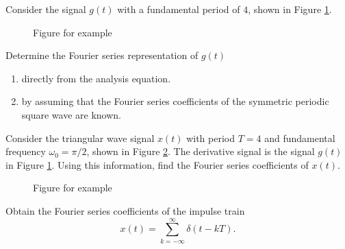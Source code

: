 \begin{frame}
    \begin{example}%
        Consider the signal $g(t)$ with a fundamental period of $4$, shown in Figure \ref{fi:example3p6}.
        \begin{figure}
          \centering
          
          \caption{Figure for example}\label{fi:example3p6}
        \end{figure}

        Determine the Fourier series representation of $g(t)$
        \begin{enumerate}
            \item directly from the analysis equation.
            \item by assuming that the Fourier series coefficients of the symmetric periodic square wave are known.
        \end{enumerate}
    \end{example}
\end{frame}

\begin{frame}
{
}
\end{frame}



\begin{frame}%
    \begin{example}
        Consider the triangular wave signal $x(t)$ with period $T=4$ and fundamental frequency $\omega_0 = \pi/2$, shown in Figure \ref{fi:example3p7}. The derivative signal is the signal $g(t)$ in Figure \ref{fi:example3p6}. Using this information, find the Fourier series coefficients of $x(t)$.
        \begin{figure}
          \centering
          
          \caption{Figure for example}\label{fi:example3p7}
        \end{figure}
    \end{example}
\end{frame}

\begin{frame}
{
}
\end{frame}


\begin{frame}%
    \begin{example}
        Obtain the Fourier series coefficients of the impulse train
        \begin{equation}\label{eq:impulsetrain}
            x(t) = \sum_{k=-\infty}^{\infty} \delta(t-kT).
        \end{equation}
    \end{example}
\end{frame}

